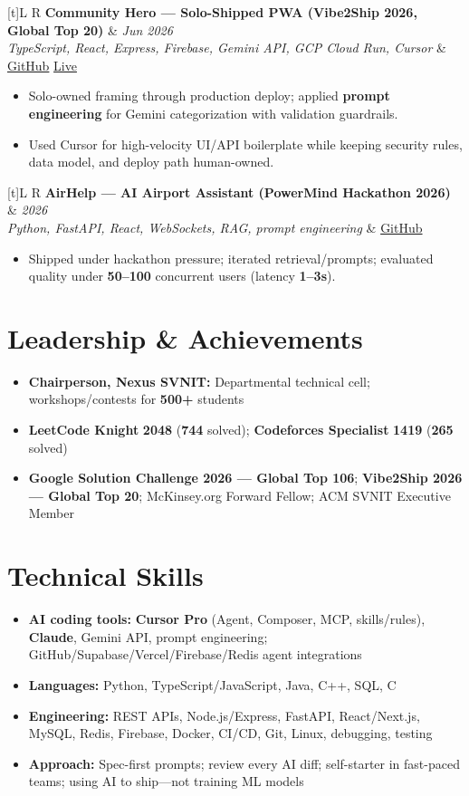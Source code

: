 \documentclass[a4paper,10pt]{article}
\newcommand{\resumeProject}[4]{%
  \vspace{0.3mm}
  \noindent
  \begin{tabularx}{\textwidth}[t]{L R}
    \textbf{#1} & \textit{#3} \\
    \textit{#2} & #4 \\
  \end{tabularx}
  \vspace{-0.3mm}%
}
\begin{document}
\resumeProject
  {Community Hero --- Solo-Shipped PWA (Vibe2Ship 2026, Global Top 20)}
  {TypeScript, React, Express, Firebase, Gemini API, GCP Cloud Run, Cursor}
  {Jun 2026}
  {\href{https://github.com/Ojas-Srivastava05/community-hero}{GitHub} \textbar{} \href{https://community-hero-987477089222.asia-south1.run.app}{Live}}
\begin{itemize}
  \item Solo-owned framing through production deploy; applied \textbf{prompt engineering} for Gemini categorization with validation guardrails.
  \item Used Cursor for high-velocity UI/API boilerplate while keeping security rules, data model, and deploy path human-owned.
\end{itemize}

\resumeProject
  {AirHelp --- AI Airport Assistant (PowerMind Hackathon 2026)}
  {Python, FastAPI, React, WebSockets, RAG, prompt engineering}
  {2026}
  {\href{https://github.com/Ojas-Srivastava05/AirHelp-AI-Airport-Assistant}{GitHub}}
\begin{itemize}
  \item Shipped under hackathon pressure; iterated retrieval/prompts; evaluated quality under \textbf{50--100} concurrent users (latency \textbf{1--3s}).
\end{itemize}

\section{Leadership \& Achievements}
\small
\begin{itemize}
  \item \textbf{Chairperson, Nexus SVNIT:} Departmental technical cell; workshops/contests for \textbf{500+} students
  \item \textbf{LeetCode Knight} \textbf{2048} (\textbf{744} solved); \textbf{Codeforces Specialist} \textbf{1419} (\textbf{265} solved)
  \item \textbf{Google Solution Challenge 2026 --- Global Top 106}; \textbf{Vibe2Ship 2026 --- Global Top 20}; McKinsey.org Forward Fellow; ACM SVNIT Executive Member
\end{itemize}

\section{Technical Skills}
\small
\begin{itemize}[label={}]
  \item \textbf{AI coding tools:} \textbf{Cursor Pro} (Agent, Composer, MCP, skills/rules), \textbf{Claude}, Gemini API, prompt engineering; GitHub/Supabase/Vercel/Firebase/Redis agent integrations
  \item \textbf{Languages:} Python, TypeScript/JavaScript, Java, C++, SQL, C
  \item \textbf{Engineering:} REST APIs, Node.js/Express, FastAPI, React/Next.js, MySQL, Redis, Firebase, Docker, CI/CD, Git, Linux, debugging, testing
  \item \textbf{Approach:} Spec-first prompts; review every AI diff; self-starter in fast-paced teams; using AI to ship---not training ML models
\end{itemize}
\end{document}
